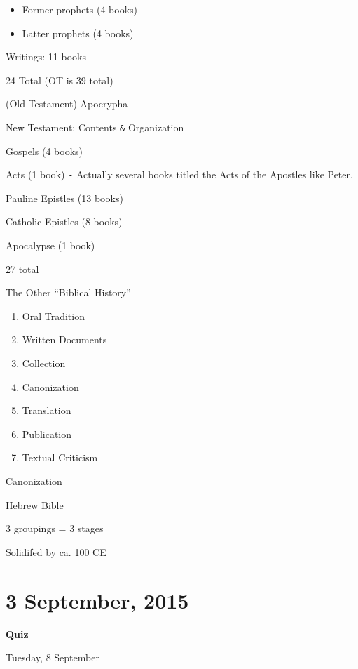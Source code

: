 \documentclass{article}
\begin{document}
    \begin{itemize}
        \item Former prophets (4 books)
        \item Latter prophets (4 books)
    \end{itemize}

    Writings: 11 books

    24 Total (OT is 39 total)

    (Old Testament) Apocrypha

\centerline{New Testament: Contents \texttt{\&} Organization}

    Gospels (4 books)

    Acts (1 book) \texttt{-} Actually several books titled the Acts of the Apostles like Peter.

    Pauline Epistles (13 books)

    Catholic Epistles (8 books)

    Apocalypse (1 book)

    27 total

\centerline{The Other ``Biblical History''}

    \begin{enumerate}
        \item Oral Tradition
        \item Written Documents
        \item Collection
        \item Canonization
        \item Translation
        \item Publication
        \item Textual Criticism
    \end{enumerate}

\centerline{Canonization}

    Hebrew Bible

    3 groupings = 3 stages

    Solidifed by ca. 100 CE

\section{3 September, 2015}

\centerline{\large \textbf{Quiz}}

\centerline{Tuesday, 8 September}


\end{document}
